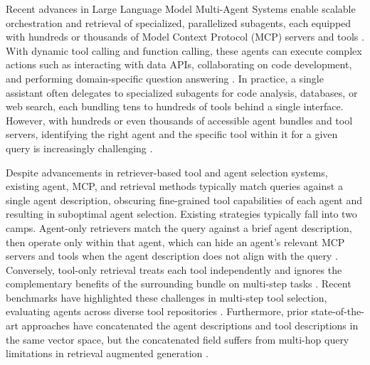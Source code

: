 \documentclass[a4paper,twoside]{article}
\begin{document}
Recent advances in Large Language Model Multi-Agent Systems enable scalable orchestration and retrieval of specialized, parallelized subagents, each equipped with hundreds or thousands of Model Context Protocol (MCP) servers and tools \cite{qin2023toolllmfacilitatinglargelanguage,li_api_bank_2023,lu2024toolsandboxstatefulconversationalinteractive,langgraph_multi_agent_systems_2024}. With dynamic tool calling and function calling, these agents can execute complex actions such as interacting with data APIs, collaborating on code development, and performing domain-specific question answering \cite{lumer2024toolshedscaletoolequippedagents}. In practice, a single assistant often delegates to specialized subagents for code analysis, databases, or web search, each bundling tens to hundreds of tools behind a single interface. However, with hundreds or even thousands of accessible agent bundles and tool servers, identifying the right agent and the specific tool within it for a given query is increasingly challenging \cite{chen2024reinvoketoolinvocationrewriting,moon_efficient_2024,lumer2025memtooloptimizingshorttermmemory,lumer2025graphragtoolfusion,liu2023controlllmaugmentlanguagemodels}.

Despite advancements in retriever-based tool and agent selection systems, existing agent, MCP, and retrieval methods typically match queries against a single agent description, obscuring fine-grained tool capabilities of each agent and resulting in suboptimal agent selection. Existing strategies typically fall into two camps. Agent-only retrievers match the query against a brief agent description, then operate only within that agent, which can hide an agent's relevant MCP servers and tools when the agent description does not align with the query \cite{mo2025livemcpbenchagentsnavigateocean,du_anytool_2024,huang2024metatoolbenchmarklargelanguage}. Conversely, tool-only retrieval treats each tool independently and ignores the complementary benefits of the surrounding bundle on multi-step tasks \cite{lumer2024toolshedscaletoolequippedagents,moon_efficient_2024,yuan_easytool_2024,chen2024reinvoketoolinvocationrewriting}. Recent benchmarks have highlighted these challenges in multi-step tool selection, evaluating agents across diverse tool repositories \cite{li_api_bank_2023,qin2023toolllmfacilitatinglargelanguage,huang2024metatoolbenchmarklargelanguage}. Furthermore, prior state-of-the-art approaches \cite{mo2025livemcpbenchagentsnavigateocean} have concatenated the agent descriptions and tool descriptions in the same vector space, but the concatenated field suffers from multi-hop query limitations in retrieval augmented generation \cite{peng2024graphretrievalaugmentedgenerationsurvey}.
\end{document}
